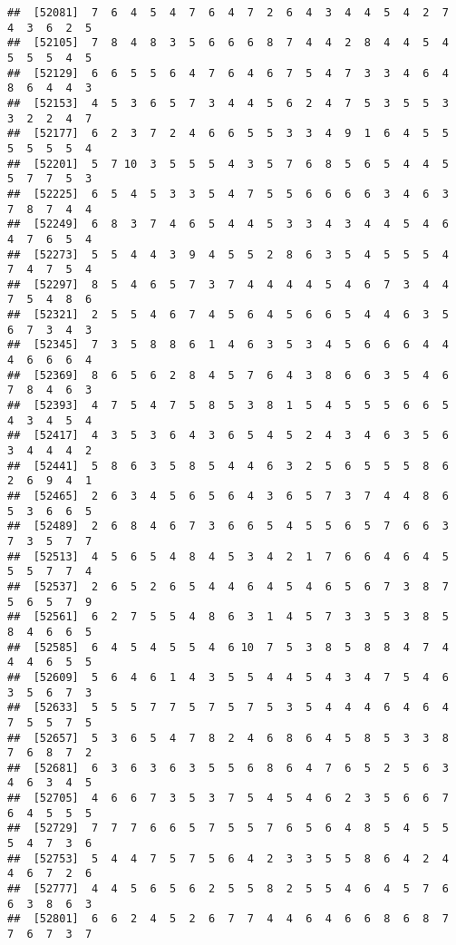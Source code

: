 \documentclass[
]{book}
\begin{document}
\begin{verbatim}
##  [52081]  7  6  4  5  4  7  6  4  7  2  6  4  3  4  4  5  4  2  7  4  3  6  2  5
##  [52105]  7  8  4  8  3  5  6  6  6  8  7  4  4  2  8  4  4  5  4  5  5  5  4  5
##  [52129]  6  6  5  5  6  4  7  6  4  6  7  5  4  7  3  3  4  6  4  8  6  4  4  3
##  [52153]  4  5  3  6  5  7  3  4  4  5  6  2  4  7  5  3  5  5  3  3  2  2  4  7
##  [52177]  6  2  3  7  2  4  6  6  5  5  3  3  4  9  1  6  4  5  5  5  5  5  5  4
##  [52201]  5  7 10  3  5  5  5  4  3  5  7  6  8  5  6  5  4  4  5  5  7  7  5  3
##  [52225]  6  5  4  5  3  3  5  4  7  5  5  6  6  6  6  3  4  6  3  7  8  7  4  4
##  [52249]  6  8  3  7  4  6  5  4  4  5  3  3  4  3  4  4  5  4  6  4  7  6  5  4
##  [52273]  5  5  4  4  3  9  4  5  5  2  8  6  3  5  4  5  5  5  4  7  4  7  5  4
##  [52297]  8  5  4  6  5  7  3  7  4  4  4  4  5  4  6  7  3  4  4  7  5  4  8  6
##  [52321]  2  5  5  4  6  7  4  5  6  4  5  6  6  5  4  4  6  3  5  6  7  3  4  3
##  [52345]  7  3  5  8  8  6  1  4  6  3  5  3  4  5  6  6  6  4  4  4  6  6  6  4
##  [52369]  8  6  5  6  2  8  4  5  7  6  4  3  8  6  6  3  5  4  6  7  8  4  6  3
##  [52393]  4  7  5  4  7  5  8  5  3  8  1  5  4  5  5  5  6  6  5  4  3  4  5  4
##  [52417]  4  3  5  3  6  4  3  6  5  4  5  2  4  3  4  6  3  5  6  3  4  4  4  2
##  [52441]  5  8  6  3  5  8  5  4  4  6  3  2  5  6  5  5  5  8  6  2  6  9  4  1
##  [52465]  2  6  3  4  5  6  5  6  4  3  6  5  7  3  7  4  4  8  6  5  3  6  6  5
##  [52489]  2  6  8  4  6  7  3  6  6  5  4  5  5  6  5  7  6  6  3  7  3  5  7  7
##  [52513]  4  5  6  5  4  8  4  5  3  4  2  1  7  6  6  4  6  4  5  5  5  7  7  4
##  [52537]  2  6  5  2  6  5  4  4  6  4  5  4  6  5  6  7  3  8  7  5  6  5  7  9
##  [52561]  6  2  7  5  5  4  8  6  3  1  4  5  7  3  3  5  3  8  5  8  4  6  6  5
##  [52585]  6  4  5  4  5  5  4  6 10  7  5  3  8  5  8  8  4  7  4  4  4  6  5  5
##  [52609]  5  6  4  6  1  4  3  5  5  4  4  5  4  3  4  7  5  4  6  3  5  6  7  3
##  [52633]  5  5  5  7  7  5  7  5  7  5  3  5  4  4  4  6  4  6  4  7  5  5  7  5
##  [52657]  5  3  6  5  4  7  8  2  4  6  8  6  4  5  8  5  3  3  8  7  6  8  7  2
##  [52681]  6  3  6  3  6  3  5  5  6  8  6  4  7  6  5  2  5  6  3  4  6  3  4  5
##  [52705]  4  6  6  7  3  5  3  7  5  4  5  4  6  2  3  5  6  6  7  6  4  5  5  5
##  [52729]  7  7  7  6  6  5  7  5  5  7  6  5  6  4  8  5  4  5  5  5  4  7  3  6
##  [52753]  5  4  4  7  5  7  5  6  4  2  3  3  5  5  8  6  4  2  4  4  6  7  2  6
##  [52777]  4  4  5  6  5  6  2  5  5  8  2  5  5  4  6  4  5  7  6  6  3  8  6  3
##  [52801]  6  6  2  4  5  2  6  7  7  4  4  6  4  6  6  8  6  8  7  7  6  7  3  7

\end{verbatim}
\end{document}
